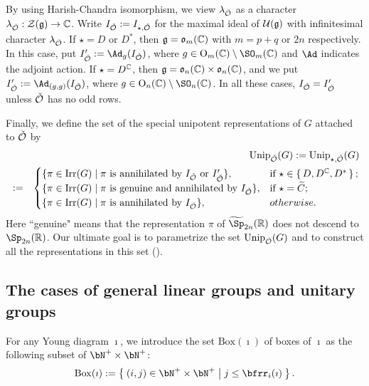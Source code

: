 \documentclass[counting_main.tex]{subfiles}
\begin{document}
By using  Harish-Chandra isomorphism, we view $\lambda_{\check {{\mathcal {O}}}}$ as a character $\lambda_{\check {{\mathcal {O}}}}: \mathcal Z(\mathfrak g)\rightarrow \mathbb{C}$. Write $I_{\check {{\mathcal {O}}}}:=I_{\star, \check {{\mathcal {O}}}}$ for the maximal ideal of $\mathcal U(\mathfrak g)$ with infinitesimal character $\lambda_{\check {{\mathcal {O}}}}$. If $\star=D$ or $D^*$, then $\mathfrak g=\mathfrak o_{m}(\mathbb{C})$ with $m=p+q$  or $2n$ respectively. In this case, put $I'_{\check \CO}:=\Ad_g(I_{\check \CO})$, where $g\in \oO_m(\C)\setminus \SO_m(\C)$ and $\Ad$ indicates the adjoint action. If $\star=D^{\mathbb{C}}$, then $\mathfrak g=\mathfrak o_{n}(\mathbb{C})\times \mathfrak o_n(\mathbb{C})$, and we put $I'_{\check \CO}:=\Ad_{(g,g)}(I_{\check \CO})$, where $g\in \oO_n(\C)\setminus \SO_n(\C)$. In all these  cases, $I_{\check {{\mathcal {O}}}}=I'_{\check {{\mathcal {O}}}}$ unless $\check {{\mathcal {O}}}$ has no odd rows.

Finally, we define the set of the special unipotent representations of $G$ attached to $\check {{\mathcal {O}}}$ by
\begin{eqnarray*}
&&\mathrm{Unip}_{\check {{\mathcal {O}}}}(G):= \mathrm{Unip}_{\star, \check {{\mathcal {O}}}}(G) \\
&:=& \begin{cases}
   \{\pi\in \mathrm{Irr}(G)\mid \pi \textrm{ is annihilated by $ I_{\check {{\mathcal {O}}}}$ or $I'_{\check {{\mathcal {O}}}}$}\}, & \text{if } \star \in \set{D, D^{\mathbb{C}}, D^*};\\
  \{\pi\in \mathrm{Irr}(G)\mid \pi \textrm{ is genuine  and annihilated by } I_{\check {{\mathcal {O}}}}\}, & \text{if } \star =\widetilde C;\\
   \{\pi\in \mathrm{Irr}(G)\mid \pi \textrm{ is annihilated by } I_{\check {{\mathcal {O}}}}\}, & otherwise.\\
      \end{cases}
\end{eqnarray*}
Here ``genuine" means that the representation $\pi$ of $\widetilde \Sp_{2n}(\R)$ does not descend to $\Sp_{2n}(\R)$.
Our ultimate goal is to parametrize the set $\mathrm{Unip}_{\check {{\mathcal {O}}}}(G)$ and to construct  all the representations in this set (\cite{BMSZ2}).




\subsection{The cases of general linear groups and unitary groups}

For any Young diagram $\imath$, we introduce the set $\mathrm{Box}(\imath)$ of boxes of $\imath$ as the following subset
of $\bN^+\times \bN^+$:
\begin{equation}\label{eq:BOX}
\mathrm{Box}(\imath):=\Set{(i,j)\in\bN^+\times \bN^+| j\leq \bfrr_i(\imath)}.
\end{equation}
\end{document}
